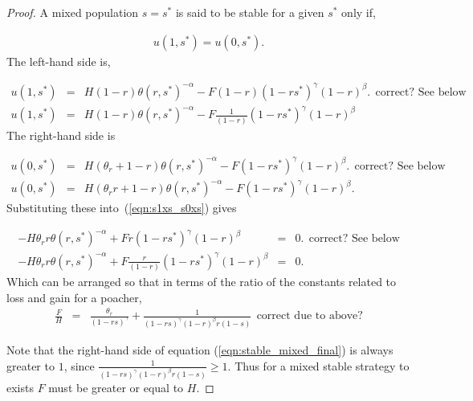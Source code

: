 \documentclass[10pt]{article}
\begin{document}
\begin{proof}
    A mixed population \(s = s^*\) is said to be stable for a
    given \(s^*\) only if,

    \begin{eqnarray}
    \label{eqn:s1xs_s0xs}
    u(1,s^*) = u(0,s^*).
    \end{eqnarray}
    The left-hand side is,

    \begin{eqnarray} \nonumber
    u(1,s^*)&=&
    H(1 - r) \theta(r, s^*)^{-\alpha} - F (1 - r)(1 - rs^*)^{\gamma}(1 - r)^{\beta} .
    \:\:\mbox{correct? See below}
          \\
u(1,s^*)&=&
    H(1 - r) \theta(r, s^*)^{-\alpha} - F \frac{1}{(1 - r)}(1 - rs^*)^{\gamma}(1 - r)^{\beta} 
    \end{eqnarray}
    The right-hand side is

    \begin{eqnarray} \nonumber
     u(0,s^*)&=&
    H(\theta_r + 1 - r)\theta(r, s^*)^{-\alpha} - F(1 - rs^*)^{\gamma}(1 - r)^{\beta} .
    \:\:\mbox{correct? See below}
          \\
    u(0,s^*)&=&
    H(\theta_rr + 1 - r)\theta(r, s^*)^{-\alpha} - F(1 - rs^*)^{\gamma}(1 - r)^{\beta} .      
    \end{eqnarray}
    Substituting these into~(\ref{eqn:s1xs_s0xs}) gives %

    \begin{eqnarray}
    \label{eqn:stablemixed}
    - H \theta_r r \theta(r, s^*)^{-\alpha}  + F r (1 - rs^*)^{\gamma}(1 - r)^{\beta} &=& 0.
     \:\:\mbox{correct? See below}
          \\
            - H \theta_r r \theta(r, s^*)^{-\alpha}  + F  \frac{r}{(1 - r)} (1 - rs^*)^{\gamma}(1 - r)^{\beta}&=& 0.
            \end{eqnarray}
            Which can be arranged so that in terms of the ratio of the constants related to loss and gain for a poacher, 
    \begin{eqnarray}
    \label{eqn:stable_mixed_final}
    \frac{F}{H} &=& \frac{\theta_r}{(1 - rs) ^ {\gamma}} + \frac{1}{(1 - rs) ^ \gamma
    (1- r) ^ {\beta} r (1- s)}
    \:\:\mbox{correct due to above?}
    \end{eqnarray}

    Note that the right-hand side of equation (\ref{eqn:stable_mixed_final})
    is always greater to \(1\), since \(\frac{1}{(1 - rs) ^ \gamma(1- r) ^ {\beta} 
    r (1- s)} \geq 1\). Thus for a mixed stable strategy to exists \(F\) must be
    greater or equal to \(H\).
\end{proof}
\end{document}

